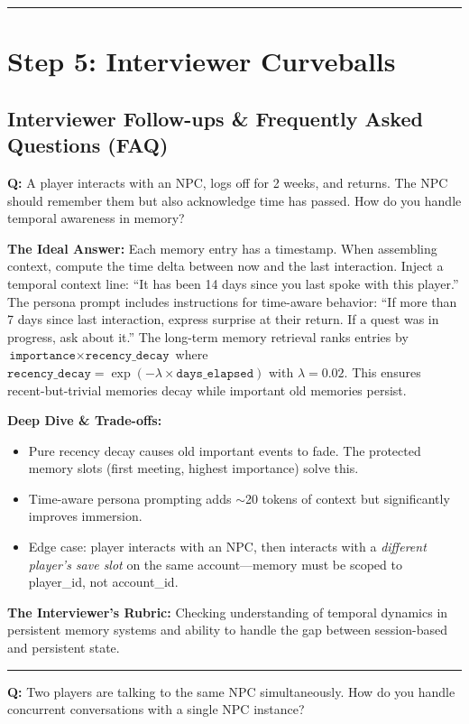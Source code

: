 \bigskip\hrule\bigskip

\section*{Step 5: Interviewer Curveballs}

\subsection*{Interviewer Follow-ups \& Frequently Asked Questions (FAQ)}

\textbf{Q:} A player interacts with an NPC, logs off for 2 weeks, and returns. The NPC should remember them but also acknowledge time has passed. How do you handle temporal awareness in memory?

\textbf{The Ideal Answer:} Each memory entry has a timestamp. When assembling context, compute the time delta between now and the last interaction. Inject a temporal context line: ``It has been 14 days since you last spoke with this player.'' The persona prompt includes instructions for time-aware behavior: ``If more than 7 days since last interaction, express surprise at their return. If a quest was in progress, ask about it.'' The long-term memory retrieval ranks entries by $\texttt{importance} \times \texttt{recency\_decay}$ where $\texttt{recency\_decay} = \exp(-\lambda \times \texttt{days\_elapsed})$ with $\lambda=0.02$. This ensures recent-but-trivial memories decay while important old memories persist.

\textbf{Deep Dive \& Trade-offs:}
\begin{itemize}
  \item Pure recency decay causes old important events to fade. The protected memory slots (first meeting, highest importance) solve this.
  \item Time-aware persona prompting adds $\sim$20 tokens of context but significantly improves immersion.
  \item Edge case: player interacts with an NPC, then interacts with a \emph{different player's save slot} on the same account---memory must be scoped to player\_id, not account\_id.
\end{itemize}

\textbf{The Interviewer's Rubric:} Checking understanding of temporal dynamics in persistent memory systems and ability to handle the gap between session-based and persistent state.

\bigskip\hrule\bigskip

\textbf{Q:} Two players are talking to the same NPC simultaneously. How do you handle concurrent conversations with a single NPC instance?

